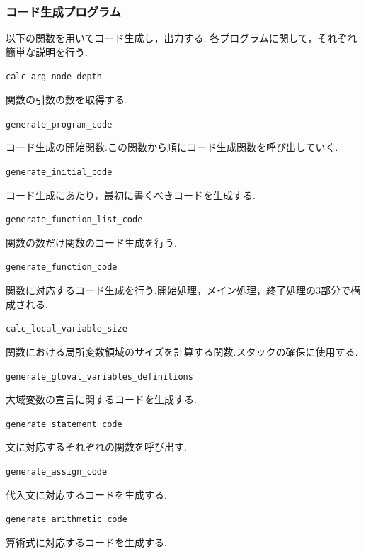 \documentclass[a4paper,11pt]{jarticle}
\begin{document}
{\subsubsection{コード生成プログラム}
以下の関数を用いてコード生成し，出力する.
各プログラムに関して，それぞれ簡単な説明を行う.
\item \verb|calc_arg_node_depth|
\begin{itemize}
関数の引数の数を取得する.
\end{itemize}
\item \verb|generate_program_code|
\begin{itemize}
コード生成の開始関数.この関数から順にコード生成関数を呼び出していく.
\end{itemize}
\item \verb|generate_initial_code|
\begin{itemize}
コード生成にあたり，最初に書くべきコードを生成する.
\end{itemize}
\item \verb|generate_function_list_code|
\begin{itemize}
関数の数だけ関数のコード生成を行う.
\end{itemize}
\item \verb|generate_function_code|
\begin{itemize}
関数に対応するコード生成を行う.開始処理，メイン処理，終了処理の3部分で構成される.
\end{itemize}
\item \verb|calc_local_variable_size|
\begin{itemize}
関数における局所変数領域のサイズを計算する関数.スタックの確保に使用する.
\end{itemize}
\item \verb|generate_gloval_variables_definitions|
\begin{itemize}
大域変数の宣言に関するコードを生成する.
\end{itemize}
\item \verb|generate_statement_code|
\begin{itemize}
文に対応するそれぞれの関数を呼び出す.
\end{itemize}
\item \verb|generate_assign_code|
\begin{itemize}
代入文に対応するコードを生成する.
\end{itemize}
\item \verb|generate_arithmetic_code|
\begin{itemize}
算術式に対応するコードを生成する.
\end{itemize}
}
\end{document}
